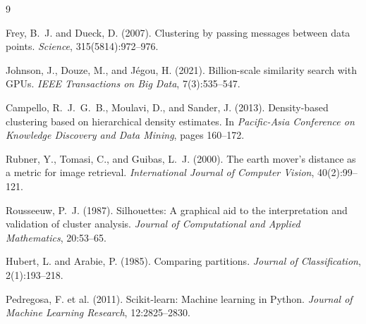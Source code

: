 \documentclass[11pt]{article}
\begin{document}
\begin{thebibliography}{9}

Frey, B.~J. and Dueck, D. (2007).
Clustering by passing messages between data points.
\textit{Science}, 315(5814):972--976.

Johnson, J., Douze, M., and J\'{e}gou, H. (2021).
Billion-scale similarity search with {GPU}s.
\textit{IEEE Transactions on Big Data}, 7(3):535--547.

Campello, R.~J.~G.~B., Moulavi, D., and Sander, J. (2013).
Density-based clustering based on hierarchical density estimates.
In \textit{Pacific-Asia Conference on Knowledge Discovery and Data Mining}, pages 160--172.

Rubner, Y., Tomasi, C., and Guibas, L.~J. (2000).
The earth mover's distance as a metric for image retrieval.
\textit{International Journal of Computer Vision}, 40(2):99--121.

Rousseeuw, P.~J. (1987).
Silhouettes: A graphical aid to the interpretation and validation of cluster analysis.
\textit{Journal of Computational and Applied Mathematics}, 20:53--65.

Hubert, L. and Arabie, P. (1985).
Comparing partitions.
\textit{Journal of Classification}, 2(1):193--218.

Pedregosa, F. et al. (2011).
Scikit-learn: Machine learning in {Python}.
\textit{Journal of Machine Learning Research}, 12:2825--2830.

\end{thebibliography}
\end{document}

